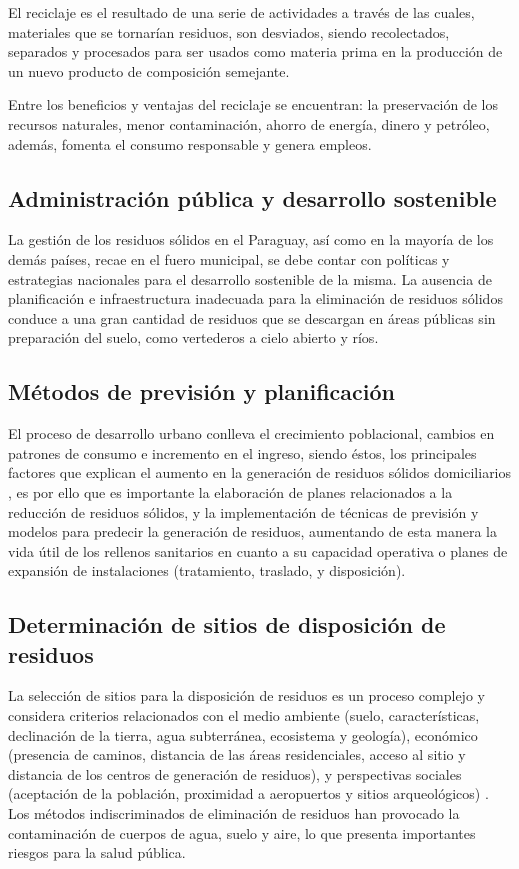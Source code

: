 El reciclaje es el resultado de una serie de actividades a través de las cuales, materiales que se tornarían residuos, son desviados, siendo recolectados, separados y procesados para ser usados como materia prima en la producción de un nuevo producto de composición semejante.

Entre los beneficios y ventajas del reciclaje se encuentran: la preservación de los recursos naturales, menor contaminación, ahorro de energía, dinero y petróleo, además, fomenta el consumo responsable y genera empleos.

\subsection{Administración pública y desarrollo sostenible}

La gestión de los residuos sólidos en el Paraguay, así como en la mayoría de los demás países, recae en el fuero municipal, se debe contar con políticas y estrategias nacionales para el desarrollo sostenible de la misma. La ausencia de planificación e infraestructura inadecuada para la eliminación de residuos sólidos conduce a una gran cantidad de residuos que se descargan en áreas públicas sin preparación del suelo, como vertederos a cielo abierto y ríos.

\subsection{Métodos de previsión y planificación}

El proceso de desarrollo urbano conlleva el crecimiento poblacional, cambios en patrones de consumo e incremento en el ingreso, siendo éstos, los principales factores que explican el aumento en la generación de residuos sólidos domiciliarios \citep{Vasquez2005ModeloChile}, es por ello que es importante la elaboración de planes relacionados a la reducción de residuos sólidos, y la implementación de técnicas de previsión y modelos para predecir la generación de residuos, aumentando de esta manera la vida útil de los rellenos sanitarios en cuanto a su capacidad operativa o planes de expansión de instalaciones (tratamiento, traslado, y disposición).

\subsection{Determinación de sitios de disposición de residuos}

La selección de sitios para la disposición de residuos es un proceso complejo y considera criterios relacionados con el medio ambiente (suelo, características, declinación de la tierra, agua subterránea, ecosistema y geología), económico (presencia de caminos, distancia de las áreas residenciales, acceso al sitio y distancia de los centros de generación de residuos), y perspectivas sociales (aceptación de la población, proximidad a aeropuertos y sitios arqueológicos) \citep{Gbanie2013ModellingLeone}. Los métodos indiscriminados de eliminación de residuos han provocado la contaminación de cuerpos de agua, suelo y aire, lo que presenta importantes riesgos para la salud pública.

